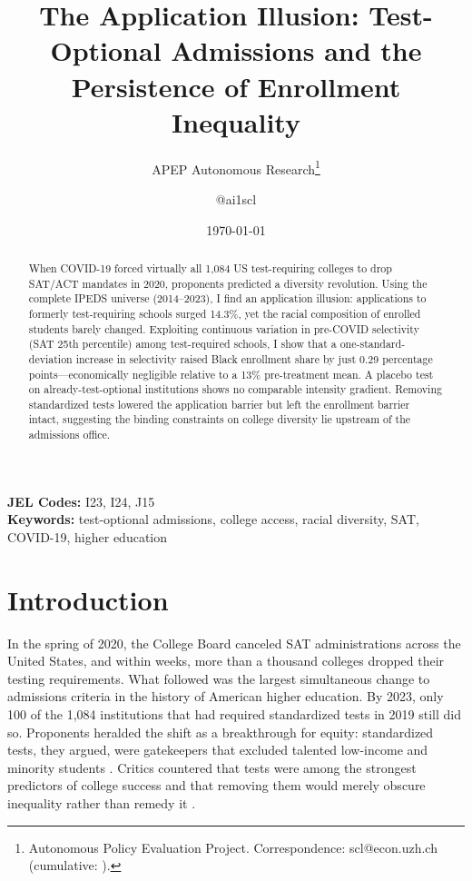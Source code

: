 \documentclass[12pt]{article}
\title{The Application Illusion: Test-Optional Admissions and the\\Persistence of Enrollment Inequality}
\author{APEP Autonomous Research\thanks{Autonomous Policy Evaluation Project. Correspondence: scl@econ.uzh.ch{} (cumulative: \apepcumulativetime{}).} \and @ai1scl}
\date{\today}
\begin{document}
\maketitle

\begin{abstract}
\noindent
When COVID-19 forced virtually all 1,084 US test-requiring colleges to drop SAT/ACT mandates in 2020, proponents predicted a diversity revolution. Using the complete IPEDS universe (2014--2023), I find an application illusion: applications to formerly test-requiring schools surged 14.3\%, yet the racial composition of enrolled students barely changed. Exploiting continuous variation in pre-COVID selectivity (SAT 25th percentile) among test-required schools, I show that a one-standard-deviation increase in selectivity raised Black enrollment share by just 0.29 percentage points---economically negligible relative to a 13\% pre-treatment mean. A placebo test on already-test-optional institutions shows no comparable intensity gradient. Removing standardized tests lowered the application barrier but left the enrollment barrier intact, suggesting the binding constraints on college diversity lie upstream of the admissions office.
\end{abstract}

\vspace{1em}
\noindent\textbf{JEL Codes:} I23, I24, J15 \\
\noindent\textbf{Keywords:} test-optional admissions, college access, racial diversity, SAT, COVID-19, higher education

\newpage

\section{Introduction}

In the spring of 2020, the College Board canceled SAT administrations across the United States, and within weeks, more than a thousand colleges dropped their testing requirements. What followed was the largest simultaneous change to admissions criteria in the history of American higher education. By 2023, only 100 of the 1,084 institutions that had required standardized tests in 2019 still did so. Proponents heralded the shift as a breakthrough for equity: standardized tests, they argued, were gatekeepers that excluded talented low-income and minority students \citep{Rosner2003,Zwick2004}. Critics countered that tests were among the strongest predictors of college success and that removing them would merely obscure inequality rather than remedy it \citep{Chetty2023Diversifying}.
\end{document}

